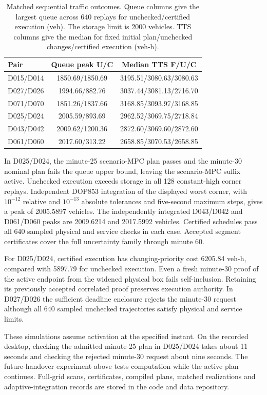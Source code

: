 \documentclass[preprint,12pt]{elsarticle}
\begin{document}
\begin{table}[t]
\centering\small
\caption{Matched sequential traffic outcomes. Queue columns give the
largest queue across 640 replays for unchecked/certified execution (veh).
The storage limit is 2000 vehicles. TTS columns give the median for fixed
initial plan/unchecked changes/certified execution (veh-h).}
\label{tab:supp-sequential-traffic}
\setlength{\tabcolsep}{5pt}
\begin{tabular}{@{}lcc@{}}
\toprule
Pair & Queue peak U/C & Median TTS F/U/C\\
\midrule
D015/D014 & 1850.69/1850.69 & 3195.51/3080.63/3080.63\\
D027/D026 & 1994.66/882.76 & 3037.44/3081.13/2716.70\\
D071/D070 & 1851.26/1837.66 & 3168.85/3093.97/3168.85\\
D025/D024 & 2005.59/893.69 & 2962.52/3069.75/2718.84\\
D043/D042 & 2009.62/1200.36 & 2872.60/3069.60/2872.60\\
D061/D060 & 2017.60/313.22 & 2658.85/3070.53/2658.85\\
\bottomrule
\end{tabular}
\end{table}

In D025/D024, the minute-25 scenario-MPC plan passes and the minute-30
nominal plan fails the queue upper bound, leaving the scenario-MPC suffix
active. Unchecked execution exceeds storage in all 128 constant-high
corner replays. Independent DOP853 integration of the displayed worst
corner, with $10^{-12}$ relative and $10^{-13}$ absolute tolerances and
five-second maximum steps, gives a peak of 2005.5897 vehicles. The
independently integrated D043/D042 and D061/D060 peaks are 2009.6214 and
2017.5992 vehicles. Certified schedules pass all 640 sampled physical and
service checks in each case. Accepted segment certificates cover the full
uncertainty family through minute 60.

For D025/D024, certified execution has changing-priority cost 6205.84
veh-h, compared with 5897.79 for unchecked execution. Even a fresh
minute-30 proof of the active endpoint from the widened physical box
fails self-inclusion. Retaining its previously accepted correlated proof
preserves execution authority. In D027/D026 the sufficient deadline
enclosure rejects the minute-30 request although all 640 sampled unchecked
trajectories satisfy physical and service limits.

These simulations assume activation at the specified instant. On the
recorded desktop, checking the admitted minute-25 plan in D025/D024 takes
about 11 seconds and checking the rejected minute-30 request about nine
seconds. The future-handover experiment above tests computation while the
active plan continues. Full-grid scans, certificates, compiled plans,
matched realizations and adaptive-integration records are stored in the
code and data repository.
\end{document}
